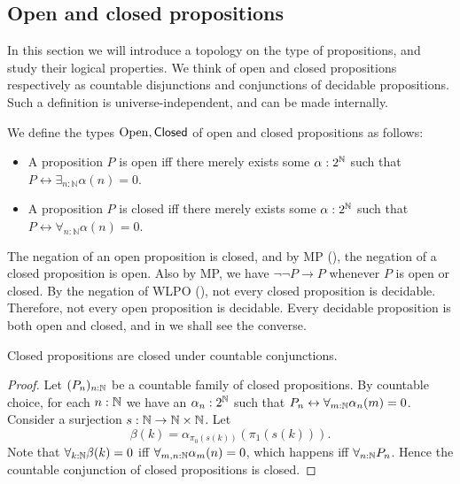 %
\subsection{Open and closed propositions}
In this section we will introduce a topology on the type of propositions, and 
study their logical properties.
We think of open and closed propositions respectively as countable disjunctions and conjunctions of decidable propositions.
Such a definition is universe-independent, and can be made internally.

\begin{definition}
  We define the types $\mathrm{Open}, \mathsf{Closed}$ of open and closed propositions as follows:
  \begin{itemize}
    \item 
    A proposition $P$ is open iff there merely exists some $\alpha:2^{\mathbb{N}}$ such that 
      $P \leftrightarrow \exists_{n:\mathbb N} \alpha(n) = 0$. 
    \item 
    A proposition $P$ is closed iff there merely exists some $\alpha:2^{\mathbb{N}}$ such that 
      $P \leftrightarrow \forall_{n:\mathbb N} \alpha(n) = 0$. 
  \end{itemize}
\end{definition}

\begin{remark}\label{rmkOpenClosedNegation}
  The negation of an open proposition is closed, 
  and by MP (), the negation of a closed proposition is open. 
  Also by MP, we have $\neg \neg P \to P$ whenever $P$ is open or closed. 
  By the negation of WLPO (), 
  not every closed proposition is decidable. 
  Therefore, not every open proposition is decidable. 
  Every decidable proposition is both open and closed, 
  and in  we shall see the converse. 
\end{remark}

\begin{lemma}\label{ClosedCountableConjunction}
  Closed propositions are closed under countable conjunctions.
\end{lemma}
\begin{proof}
  Let $(P_n)_{n:\mathbb{N}}$ be a countable family of closed propositions. 
  By countable choice, for each 
  $n:\mathbb{N}$ we have an $\alpha_n:2^{\mathbb{N}} $ 
  such that $P_n \leftrightarrow \forall_{m:\mathbb{N}} \alpha_n(m)  =0$. 
  Consider a surjection $s:\mathbb{N} \to \mathbb{N} \times \mathbb{N}$.
  Let 
  $$\beta(k) = \alpha_{\pi_0(s(k))}(\pi_1 (s(k))).$$
  Note that $\forall_{k:\mathbb{N}} \beta(k) = 0$ iff 
  $\forall_{m,n:\mathbb{N}}\alpha_m(n) = 0$, which happens iff $\forall_{n:\mathbb{N}} P_n$. 
  Hence the countable conjunction of closed propositions is closed. 
\end{proof} 

